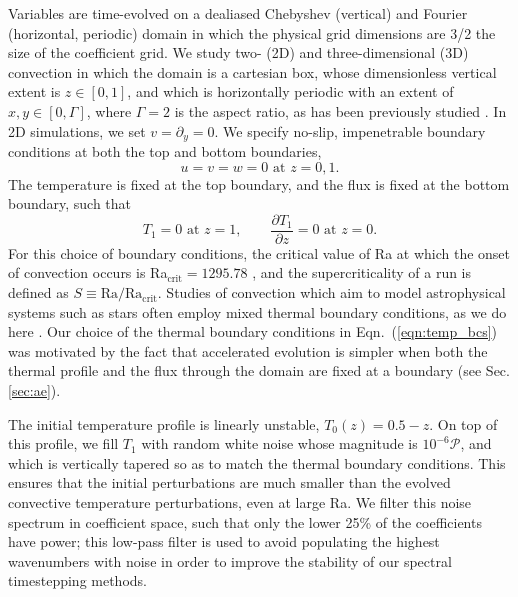 Variables are time-evolved on a dealiased Chebyshev (vertical)
and Fourier (horizontal, periodic) domain in which the
physical grid dimensions are 3/2 the size of the coefficient grid.  
We study two- (2D) and three-dimensional (3D) convection in which the domain is a cartesian box, 
whose dimensionless vertical extent is $z \in [0, 1]$, 
and which is horizontally periodic with an extent of $x, y \in [0, \Gamma]$,
where $\Gamma = 2$ is the aspect ratio, as has been previously studied
\cite{goluskin&all2014, johnston&doering2009}. 
In 2D simulations, we set $v = \partial_y = 0$.
We specify no-slip, impenetrable boundary conditions at both the top and
bottom boundaries,
\begin{equation}
u = v = w = 0 \, \, \text{at}\,\,z = 0,1.
\label{eqn:vel_bcs}
\end{equation}
The temperature is fixed at the top boundary, and the flux is fixed at the
bottom boundary, such that
\begin{equation}
T_1 = 0 \,\,\text{at}\,\, z=1, \qquad
\frac{\partial T_1}{\partial z} = 0\,\,\text{at}\,\,z=0.
\label{eqn:temp_bcs}
\end{equation}
For this choice of boundary conditions, the critical value of Ra at which
the onset of convection occurs is Ra$_{\text{crit}} = 1295.78$ \cite{goluskin2016}, and the
supercriticality of a run is defined as $S \equiv \text{Ra}/\text{Ra}_{\text{crit}}$.
Studies of convection which aim to model
astrophysical systems such as stars often employ mixed thermal
boundary conditions, as we do here \cite{hurlburt&all1984, cattaneo&all1991, korre&all2017}.
Our choice of the thermal boundary conditions in Eqn.~(\ref{eqn:temp_bcs}) 
was motivated by the fact that accelerated evolution is simpler when both the
thermal profile and the flux through the domain are fixed at a boundary 
(see Sec. \ref{sec:ae}).

The initial temperature profile is linearly unstable,
$T_0(z) = 0.5 - z$. On top of this profile, we fill $T_1$ with
random white noise whose magnitude is $10^{-6}\mathcal{P}$, and which is
vertically tapered so as to match the thermal boundary conditions.
This ensures that the initial perturbations are much smaller than the
evolved convective temperature perturbations, even at large Ra.
We filter this noise spectrum in coefficient space, 
such that only the lower 25\% of the coefficients
have power; this low-pass filter is used to avoid populating the
highest wavenumbers with noise in order to improve the stability of our
spectral timestepping methods.


